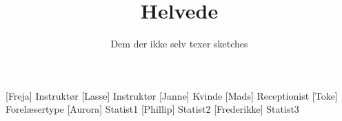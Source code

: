 \documentclass[a4paper,11pt]{article}
\title{Helvede}
\author{Dem der ikke selv texer sketches}
\begin{document}
\maketitle

\begin{roles}
[Freja] Instruktør
[Lasse] Instruktør
[Janne] Kvinde 
[Mads] Receptionist
[Toke] Forelæsertype
[Aurora] Statist1
[Phillip] Statist2
[Frederikke] Statist3
\end{roles}

\begin{props}
\prop{}
\end{props}


\begin{sketch}




\end{sketch}
\end{document}
